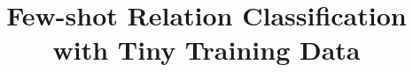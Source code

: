 \documentclass{article}
\title{Few-shot Relation Classification with Tiny Training Data}
\begin{document}
\maketitle

\begin{CJK}{UTF8}{gkai}






%









%
\end{CJK}



\end{document}
